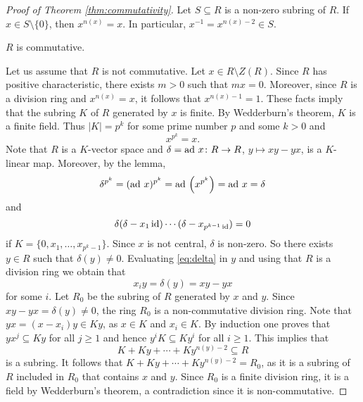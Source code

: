 \begin{proof}[Proof of Theorem \ref{thm:commutativity}]
    Let $S\subseteq R$ is a non-zero subring of $R$. If $x\in S\setminus\{0\}$, 
    then 
    $x^{n(x)}=x$. In particular, $x^{-1}=x^{n(x)-2}\in S$.
    
    \begin{claim}
        $R$ is commutative.
    \end{claim}
    
    Let us assume that $R$ is not commutative. Let $x\in R\setminus Z(R)$. 
    Since $R$ has positive characteristic, there exists $m>0$ such that 
    $mx=0$. Moreover, since $R$ is a division ring and 
    $x^{n(x)}=x$, it follows that $x^{n(x)-1}=1$. These facts imply that
    the subring $K$ of $R$ generated by
    $x$ is finite. By Wedderburn's theorem, $K$ is 
    a finite field. 
    Thus 
    $|K|=p^k$ for some prime number $p$ and some $k>0$ and 
    \[
    x^{p^k}=x.
    \]
    Note that $R$ is a $K$-vector space
    and $\delta=\operatorname{ad}\,x\colon R\to R$, $y\mapsto xy-yx$, is a $K$-linear map. Moreover, 
    by the lemma, 
    \[
    \delta^{p^k}=(\operatorname{ad}\,x)^{p^k}=\operatorname{ad}\,\left(x^{p^k}\right)=\operatorname{ad}\,x=\delta
    \]
    and 
    \begin{equation}
        \label{eq:delta}
        \delta(\delta-x_1\operatorname{id})\cdots (\delta-x_{p^{k-1}\operatorname{id}})=0
    \end{equation}
    if $K=\{0,x_1,\dots,x_{p^k-1}\}$. Since $x$ is not central, 
    $\delta$ is non-zero. So there exists $y\in R$ such that $\delta(y)\ne 0$. 
    Evaluating \eqref{eq:delta} in $y$ and using that $R$ is a division ring 
    we obtain that 
    \[
    x_iy=\delta(y)=xy-yx
    \]
    for some $i$. Let $R_0$ be the subring of $R$ generated by $x$ and $y$. 
    Since $xy-yx=\delta(y)\ne 0$, the ring $R_0$ is a 
    non-commutative division ring. Note that 
    $yx=(x-x_i)y\in Ky$, as $x\in K$ and $x_i\in K$. By induction one proves
    that $yx^j\subseteq Ky$ for all $j\geq 1$ and hence
    $y^iK\subseteq Ky^i$ for
    all $i\geq1$. This implies that
    \[
    K+Ky+\cdots+Ky^{n(y)-2}\subseteq R
    \]
    is a subring. It follows that $K+Ky+\cdots+Ky^{n(y)-2}=R_0$, 
    as it is a subring of $R$ included in $R_0$ 
    that contains $x$ and $y$. Since 
    $R_0$ is a finite division ring, it is a field 
    by Wedderburn's theorem, a contradiction since
    it is non-commutative.
\end{proof}


